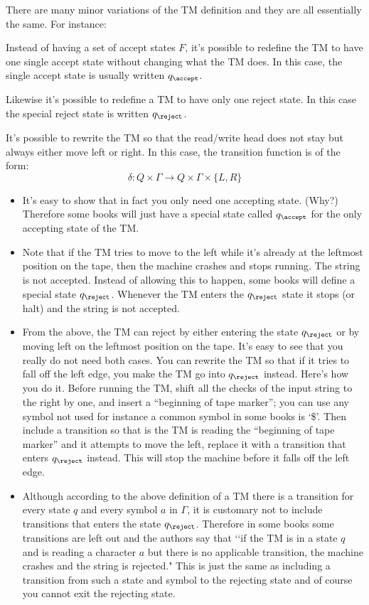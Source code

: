 There are many minor variations of the TM definition and they are
all essentially the same.
For instance:
\begin{tightlist}
\item Instead of having a set of accept states $F$, it's possible to redefine
the TM to have one single accept state without changing what the TM does.
In this case, the single accept state is usually written $q_\accept$.
\item Likewise it's possible to redefine a TM to have only one reject state.
In this case the special reject state is written $q_\reject$.
\item It's possible to rewrite the TM so that the read/write head does not
stay but always either move left or right.
In this case, the transition function is of the form:
\[
\delta : Q \times \Gamma \rightarrow Q 
\times \Gamma \times \{L, R\}
\]
\end{tightlist}

\begin{defn}
\begin{itemize}
 \item It's easy to show that in fact you only need one accepting
 state. (Why?) Therefore some books will just have a special state
 called $q_{\accept}$ for the only accepting state of the TM.
 \item Note that if the TM tries to move to the left while it's already at the leftmost
 position on the tape, then the machine crashes and stops running. The string is not accepted.
 Instead of allowing this to happen, some books will define a
 special state $q_{\reject}$. Whenever the TM enters the $q_\reject$ state it
 stops (or halt) and the string is not accepted.
 \item From the above, the TM can reject by either entering the
 state $q_{\reject}$ or by moving left on the leftmost position on
 the tape. It's easy to see that you really do not need both
 cases. You can rewrite the TM so that if it tries to fall off the
 left edge, you make the TM go into $q_{\reject}$ instead. Here's
 how you do it. Before running the TM, shift all the checks of the
 input string to the right by one, and insert a ``beginning of tape
 marker''; you can use any symbol not used for instance a common symbol in some books is `\$'.
 Then include a transition so that is the TM is reading
 the ``beginning of tape marker'' and it attempts to move the
 left, replace it with a transition that enters $q_{\reject}$
 instead. This will stop the machine before it falls off the left
 edge.
 \item Although according to the above definition of a TM there is
 a transition for every state $q$ and every symbol $a$ in
 $\Gamma$, it is customary not to include transitions that enters
 the state $q_{\reject}$. Therefore in some books some transitions
 are left out and the authors say that \lq\lq if the TM is in a state $q$
 and is reading a character $a$ but there is no applicable
 transition, the machine crashes and the string is rejected." This
 is just the same as including a transition from such a state and
 symbol to the rejecting state and of course you cannot exit the
 rejecting state.
 \end{itemize}
\end{defn}

